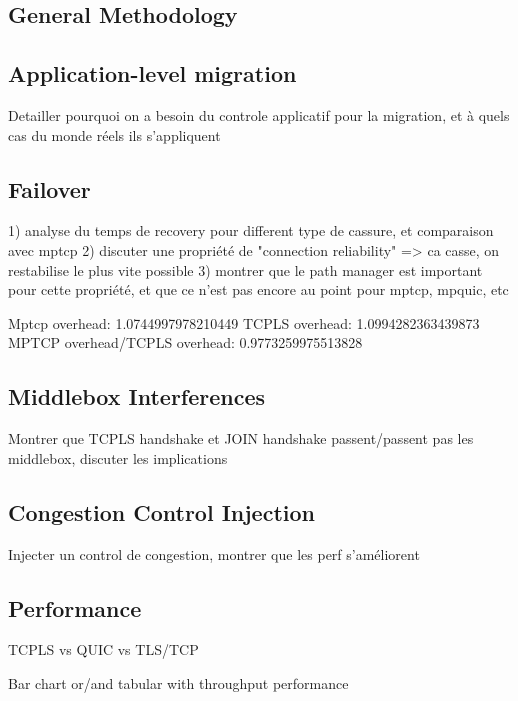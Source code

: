 
\subsection{General Methodology}

\subsection{Application-level migration}

Detailler pourquoi on a besoin du controle applicatif pour la migration, et à
quels cas du monde réels ils s'appliquent

\subsection{Failover}

1) analyse du temps de recovery pour different type de cassure, et comparaison avec mptcp
2) discuter une propriété de "connection reliability" => ca casse, on restabilise le plus vite possible
3) montrer que le path manager est important pour cette propriété, et que ce n'est pas encore au point pour mptcp, mpquic, etc

Mptcp overhead: 1.0744997978210449
TCPLS overhead: 1.0994282363439873
MPTCP overhead/TCPLS overhead:              0.9773259975513828


\subsection{Middlebox Interferences}

Montrer que TCPLS handshake et JOIN handshake passent/passent pas les middlebox,
discuter les implications

\subsection{Congestion Control Injection}

Injecter un control de congestion, montrer que les perf s'améliorent

\subsection{Performance}

TCPLS vs QUIC vs TLS/TCP

Bar chart or/and tabular with throughput performance
